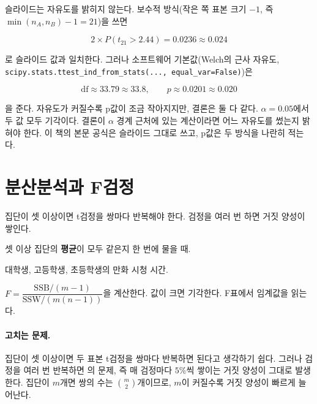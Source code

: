 \begin{pitfall}
슬라이드는 자유도를 밝히지 않는다. 보수적 방식(작은 쪽 표본 크기
$-1$, 즉 $\min(n_A, n_B) - 1 = 21$)을 쓰면

\[
  2 \times P(t_{21} > 2.44) = 0.0236 \approx 0.024
\]

로 슬라이드 값과 일치한다. 그러나 소프트웨어 기본값(Welch의 근사
자유도, \texttt{scipy.stats.ttest\_ind\_from\_stats(..., equal\_var=False)})은

\[
  \text{df} \approx 33.79 \approx 33.8, \qquad p \approx 0.0201 \approx 0.020
\]

을 준다. 자유도가 커질수록 p값이 조금 작아지지만, 결론은 둘 다 같다.
$\alpha = 0.05$에서 두 값 모두 기각이다. 결론이 $\alpha$ 경계 근처에
있는 계산이라면 어느 자유도를 썼는지 밝혀야 한다. 이 책의 본문 공식은
슬라이드 그대로 쓰고, p값은 두 방식을 나란히 적는다.
\end{pitfall}

\section{분산분석과 F검정}
\label{sec:cd-anova}

\begin{inbrief}
  \item[Why] 집단이 셋 이상이면 t검정을 쌍마다 반복해야 한다. 검정을
             여러 번 하면 거짓 양성이 쌓인다.
  \item[When] 셋 이상 집단의 \textbf{평균}이 모두 같은지 한 번에
              물을 때.
  \item[Where] 대학생, 고등학생, 초등학생의 만화 시청 시간.
  \item[How] $F = \dfrac{\mathrm{SSB}/(m-1)}{\mathrm{SSW}/(m(n-1))}$을
             계산한다. 값이 크면 기각한다. F표에서 임계값을 읽는다.
\end{inbrief}

\paragraph{고치는 문제.} 집단이 셋 이상이면 두 표본 t검정을 쌍마다
반복하면 된다고 생각하기 쉽다. 그러나 검정을 여러 번 반복하면
의 문제, 즉 매 검정마다 $5\%$씩 쌓이는 거짓
양성이 그대로 발생한다. 집단이 $m$개면 쌍의 수는
$\binom{m}{2}$개이므로, $m$이 커질수록 거짓 양성이 빠르게 늘어난다.

